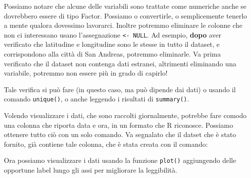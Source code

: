 \documentclass[]{book}
\newenvironment{Shaded}{\begin{snugshade}}{\end{snugshade}}
\newcommand{\CommentTok}[1]{\textcolor[rgb]{0.56,0.35,0.01}{\textit{#1}}}
\newcommand{\DataTypeTok}[1]{\textcolor[rgb]{0.13,0.29,0.53}{#1}}
\newcommand{\FloatTok}[1]{\textcolor[rgb]{0.00,0.00,0.81}{#1}}
\newcommand{\KeywordTok}[1]{\textcolor[rgb]{0.13,0.29,0.53}{\textbf{#1}}}
\newcommand{\NormalTok}[1]{#1}
\newcommand{\OperatorTok}[1]{\textcolor[rgb]{0.81,0.36,0.00}{\textbf{#1}}}
\newcommand{\OtherTok}[1]{\textcolor[rgb]{0.56,0.35,0.01}{#1}}
\newcommand{\StringTok}[1]{\textcolor[rgb]{0.31,0.60,0.02}{#1}}
\begin{document}
Possiamo notare che alcune delle variabili sono trattate come numeriche anche se dovrebbero essere di tipo Factor. Possiamo o convertirle, o semplicemente tenerlo a mente qualora dovessimo lavorarci. Inoltre potremmo eliminare le colonne che non ci interessano usano l'assegnazione \texttt{\textless{}-\ NULL}. Ad esempio, \textbf{dopo} aver verificato che latitudine e longitudine sono le stesse in tutto il dataset, e corrispondono alla città di San Andreas, potremmo eliminarle. Va prima verificato che il dataset non contenga dati estranei, altrimenti eliminando una variabile, potremmo non essere più in grado di capirlo!

Tale verifica si può fare (in questo caso, ma può dipende dai dati) o usando il comando \texttt{unique()}, o anche leggendo i risultati di \texttt{summary()}.

Volendo visualizzare i dati, che sono raccolti giornalmente, potrebbe fare comodo una colonna che riporta data e ora, in un formato che R riconosce.
Possiamo ottenere tutto ciò con un solo comando. Va segnalato che il datset che è stato fornito, già contiene tale colonna, che è stata creata con il comando:

\begin{Shaded}
\end{Shaded}

Ora possiamo visualizzare i dati usando la funzione \texttt{plot()} aggiungendo delle opportune label lungo gli assi per migliorare la leggibilità.

\begin{Shaded}
\end{Shaded}
\end{document}
